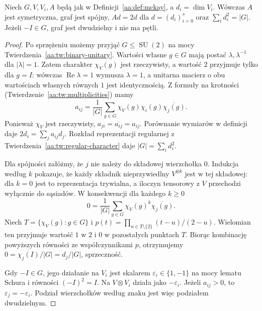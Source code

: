 \begin{twierdzenie}
\label{aa:tw:mckay-properties}
Niech $G,V,V_i,A$ będą jak w
Definicji~\ref{aa:def:mckay}, a $d_i=\dim V_i$.
Wówczas $A$ jest symetryczna, graf jest spójny,
$Ad=2d$ dla $d=(d_i)_{i=0}^s$ oraz
$\sum_i d_i^2=|G|$. Jeżeli $-I\in G$, graf jest dwudzielny
i nie ma pętli.
\end{twierdzenie}
\begin{proof}
Po sprzężeniu możemy przyjąć $G\le\operatorname{SU}(2)$
na mocy Twierdzenia~\ref{aa:tw:binary-unitary}.
Wartości własne $g\in G$ mają postać $\lambda,\lambda^{-1}$
dla $|\lambda|=1$. Zatem charakter $\chi_V(g)$ jest rzeczywisty,
a wartość $2$ przyjmuje tylko dla $g=I$: wówczas
$\operatorname{Re}\lambda=1$ wymusza $\lambda=1$,
a unitarna macierz o obu wartościach własnych równych $1$
jest identycznością.
Z formuły na krotności
(Twierdzenie~\ref{aa:tw:multiplicities}) mamy
\[
 a_{ij}=\frac1{|G|}\sum_{g\in G}
   \chi_V(g)\chi_i(g)\overline{\chi_j(g)}.
\]
Ponieważ $\chi_V$ jest rzeczywisty, $a_{ji}=\overline{a_{ij}}=a_{ij}$.
Porównanie wymiarów w definicji daje $2d_i=\sum_j a_{ij}d_j$.
Rozkład reprezentacji regularnej z
Twierdzenia~\ref{aa:tw:regular-character} daje
$|G|=\sum_i d_i^2$.

Dla spójności załóżmy, że $j$ nie należy do składowej
wierzchołka $0$. Indukcja według $k$ pokazuje, że
każdy składnik nieprzywiedlny $V^{\otimes k}$
jest w tej składowej: dla $k=0$ jest to reprezentacja
trywialna, a iloczyn tensorowy z $V$ przechodzi
wyłącznie do sąsiadów. W konsekwencji dla każdego $k\ge0$
\[
 0=\frac1{|G|}\sum_{g\in G}\chi_V(g)^k\overline{\chi_j(g)}.
\]
Niech $T=\{\chi_V(g):g\in G\}$ i
$p(t)=\prod_{u\in T\setminus\{2\}}(t-u)/(2-u)$.
Wielomian ten przyjmuje wartość $1$ w $2$ i $0$ w pozostałych
punktach $T$. Biorąc kombinację powyższych równości
ze współczynnikami $p$, otrzymujemy
$0=\overline{\chi_j(I)}/|G|=d_j/|G|$, sprzeczność.

Gdy $-I\in G$, jego działanie na $V_i$ jest skalarem
$\varepsilon_i\in\{1,-1\}$ na mocy lematu Schura
i równości $(-I)^2=I$. Na $V\otimes V_i$ działa jako
$-\varepsilon_i$. Jeżeli $a_{ij}>0$, to
$\varepsilon_j=-\varepsilon_i$. Podział wierzchołków
według znaku jest więc podziałem dwudzielnym.
\end{proof}

